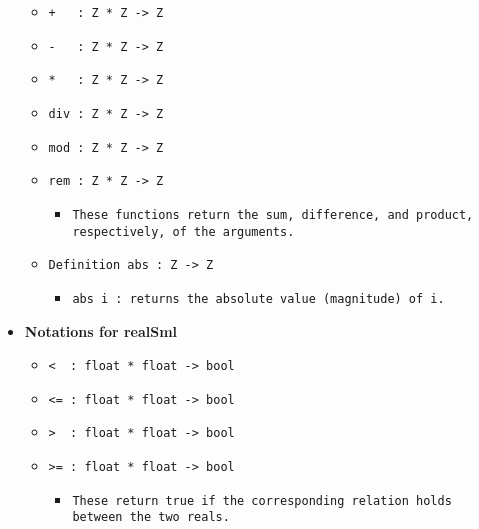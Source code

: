 \documentclass[11pt]{report}
\begin{document}
\begin{itemize}
\begin{itemize}
\item  \texttt{+ \ \ : Z * Z -> Z}

\item  \texttt{- \ \ : Z * Z -> Z}

\item  \texttt{* \ \ : Z * Z -> Z}

\item  \texttt{div : Z * Z -> Z}

\item  \texttt{mod : Z * Z -> Z}

\item  \texttt{rem : Z * Z -> Z}

\begin{itemize}
\item  \begin{flushleft} \texttt{These functions return the sum, difference, and product, respectively, of the arguments.} \end{flushleft}
\end{itemize}
\coqdocemptyline

\item  \texttt{Definition abs : Z -> Z}

\begin{itemize}
\item  \texttt{abs i : returns the absolute value (magnitude) of i.}



\end{itemize}

\end{itemize}

\item  \textbf{Notations for realSml}

\begin{itemize}
\item  \texttt{< \ : float * float -> bool}

\item  \texttt{<= : float * float -> bool}

\item  \texttt{> \ : float * float -> bool}

\item  \texttt{>= : float * float -> bool}

\begin{itemize}
\item \begin{flushleft} \texttt{These return true if the corresponding relation holds between the two reals.} \end{flushleft}
\coqdocemptyline



\end{itemize}
\end{itemize}
\end{itemize}
\end{document}
